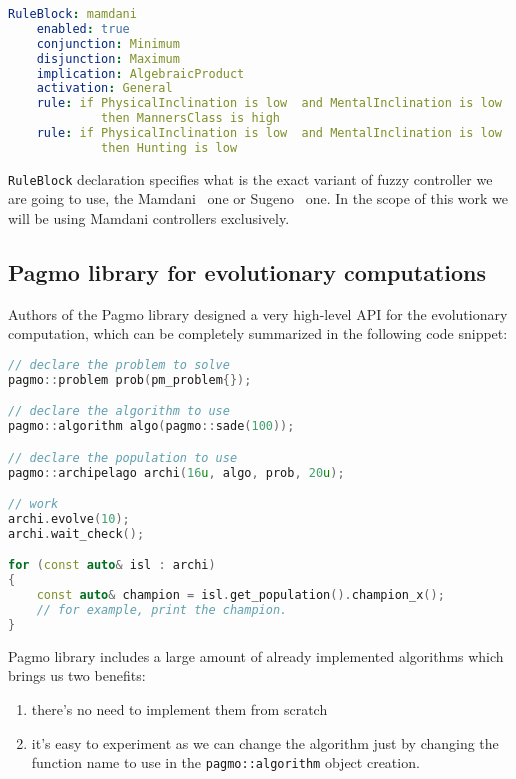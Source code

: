 \documentclass[11pt, a4paper]{article}
\begin{document}
  \begin{lstlisting}[language=yaml]
  RuleBlock: mamdani
    enabled: true
    conjunction: Minimum
    disjunction: Maximum
    implication: AlgebraicProduct
    activation: General
    rule: if PhysicalInclination is low  and MentalInclination is low
    	     then MannersClass is high
    rule: if PhysicalInclination is low  and MentalInclination is low 
    	     then Hunting is low
  \end{lstlisting}

	
  \texttt{RuleBlock} declaration specifies what is the exact variant of fuzzy controller we are going to use, the Mamdani~\cite{fuzzy::Mamdani} one or Sugeno~\cite{fuzzy::Sugeno} one.
  In the scope of this work we will be using Mamdani controllers exclusively.

	\subsection{Pagmo library for evolutionary computations}

	Authors of the Pagmo library designed a very high-level API for the evolutionary computation, which can be completely summarized in the following code snippet:
	
	\begin{lstlisting}[language=c++]
// declare the problem to solve
pagmo::problem prob(pm_problem{});

// declare the algorithm to use
pagmo::algorithm algo(pagmo::sade(100));

// declare the population to use
pagmo::archipelago archi(16u, algo, prob, 20u);

// work
archi.evolve(10);
archi.wait_check();

for (const auto& isl : archi)
{
	const auto& champion = isl.get_population().champion_x();
	// for example, print the champion.
}
	\end{lstlisting}

	Pagmo library includes a large amount of already implemented algorithms which brings us two benefits:
	
	\begin{enumerate}
		\item there's no need to implement them from scratch
		\item it's easy to experiment as we can change the algorithm just by changing the function name to use in the \texttt{pagmo::algorithm} object creation.
	\end{enumerate}
	
\end{document}
